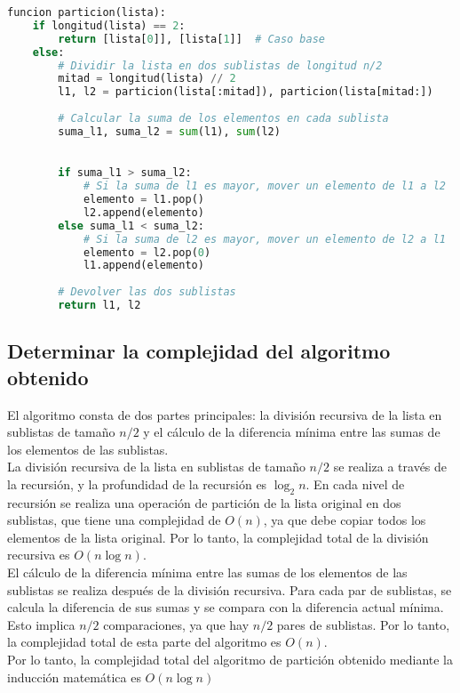 \begin{lstlisting}[language=python]
funcion particion(lista):
    if longitud(lista) == 2:
        return [lista[0]], [lista[1]]  # Caso base
    else:
        # Dividir la lista en dos sublistas de longitud n/2
        mitad = longitud(lista) // 2
        l1, l2 = particion(lista[:mitad]), particion(lista[mitad:])
        
        # Calcular la suma de los elementos en cada sublista
        suma_l1, suma_l2 = sum(l1), sum(l2)
        

        if suma_l1 > suma_l2:
            # Si la suma de l1 es mayor, mover un elemento de l1 a l2
            elemento = l1.pop()
            l2.append(elemento)
        else suma_l1 < suma_l2:
            # Si la suma de l2 es mayor, mover un elemento de l2 a l1
            elemento = l2.pop(0)
            l1.append(elemento)
            
        # Devolver las dos sublistas
        return l1, l2

\end{lstlisting}

\subsection{Determinar la complejidad del algoritmo obtenido}

El algoritmo consta de dos partes principales: la división recursiva de la lista en sublistas de tamaño $n/2$ y el cálculo de la diferencia mínima entre las sumas de los elementos de las sublistas.\\

La división recursiva de la lista en sublistas de tamaño $n/2$ se realiza a través de la recursión, y la profundidad de la recursión es $\log_2 n$. En cada nivel de recursión se realiza una operación de partición de la lista original en dos sublistas, que tiene una complejidad de $O(n)$, ya que debe copiar todos los elementos de la lista original. Por lo tanto, la complejidad total de la división recursiva es $O(n\log n)$.\\

El cálculo de la diferencia mínima entre las sumas de los elementos de las sublistas se realiza después de la división recursiva. Para cada par de sublistas, se calcula la diferencia de sus sumas y se compara con la diferencia actual mínima. Esto implica $n/2$ comparaciones, ya que hay $n/2$ pares de sublistas. Por lo tanto, la complejidad total de esta parte del algoritmo es $O(n)$.\\

Por lo tanto, la complejidad total del algoritmo de partición obtenido mediante la inducción matemática es $O(n\log n)$\\

